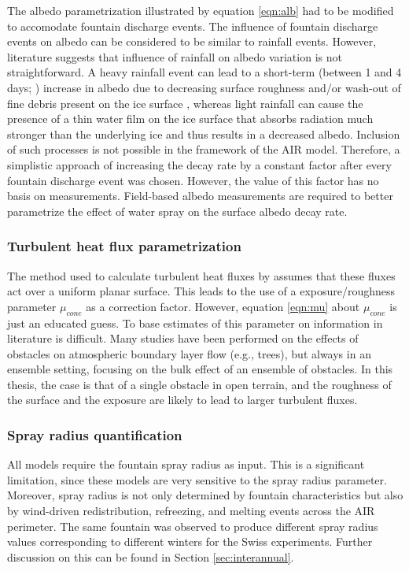 The albedo parametrization illustrated by equation \ref{eqn:alb} had to be modified to accomodate fountain
discharge events. The influence of fountain discharge events on albedo can be considered to be similar to
rainfall events. However, literature suggests that influence of rainfall on albedo variation is not
straightforward. A heavy rainfall event can lead to a short-term (between 1 and 4 days;
\citet{azzoni_estimating_2016}) increase in albedo due to decreasing surface roughness and/or wash-out of fine
debris present on the ice surface \citep{brock_analysis_2004, azzoni_estimating_2016}, whereas light rainfall
can cause the presence of a thin water film on the ice surface that absorbs radiation much stronger than the
underlying ice and thus results in a decreased albedo. Inclusion of such processes is not possible in the
framework of the \ac{AIR} model. Therefore, a simplistic approach of increasing the decay rate by a constant
factor after every fountain discharge event was chosen. However, the value of this factor has no basis on
measurements. Field-based albedo measurements are required to better parametrize the effect of water spray on
the surface albedo decay rate.

\subsubsection{Turbulent heat flux parametrization}

The method used to calculate turbulent heat fluxes by \citet{garrattAtmosphericBoundaryLayer1992} assumes that
these fluxes act over a uniform planar surface. This leads to the use of a exposure/roughness parameter
$\mu_{cone}$ as a correction factor. However, equation \ref{eqn:mu} about $\mu_{cone}$ is just an educated
guess. To base estimates of this parameter on information in literature is difficult. Many studies have been
performed on the effects of obstacles on atmospheric boundary layer flow (e.g., trees), but always in an
ensemble setting, focusing on the bulk effect of an ensemble of obstacles. In this thesis, the case is that of a
single obstacle in open terrain, and the roughness of the surface and the exposure are likely to lead to larger
turbulent fluxes.

\subsubsection{Spray radius quantification}

All models require the fountain spray radius as input. This is a significant limitation, since these models are
very sensitive to the spray radius parameter. Moreover, spray radius is not only determined by fountain
characteristics but also by wind-driven redistribution, refreezing, and melting events across the \ac{AIR}
perimeter. The same fountain was observed to produce different spray radius values corresponding to different
winters for the Swiss experiments. Further discussion on this can be found in Section \ref{sec:interannual}.

